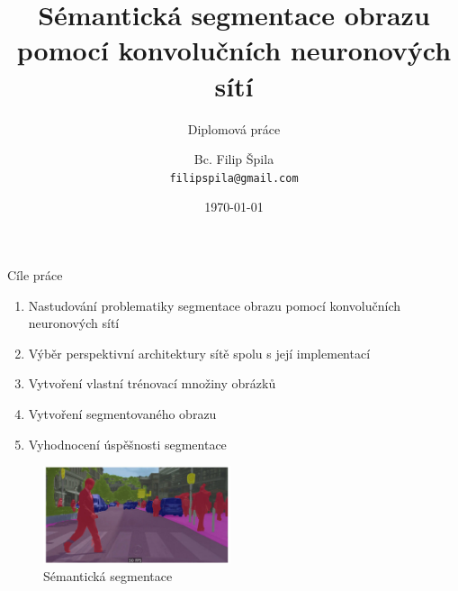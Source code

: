\documentclass[aspectratio=1610]{beamer}
\title[Sémantická segmentace obrazu pomocí CNN]
{Sémantická segmentace obrazu pomocí konvolučních neuronových sítí}
\subtitle
{Diplomová práce}
\author[Bc. Filip Špila]
{Bc. Filip Špila \\
	\texttt{filipspila@gmail.com}}
\institute
{Ústav mechaniky těles, mechatroniky a biomechaniky \\
	Vysoké učení technické v Brně
}
\date{\today}
\begin{document}
	
	
	\begin{frame}
	\titlepage
\end{frame}


\begin{frame}{Cíle práce}
\begin{enumerate}
	\item Nastudování problematiky segmentace obrazu pomocí konvolučních neuronových sítí
	\item Výběr perspektivní architektury sítě spolu s její implementací
	\item Vytvoření vlastní trénovací množiny obrázků
	\item Vytvoření segmentovaného obrazu
	\item Vyhodnocení úspěšnosti segmentace
\end{enumerate}	
	
\begin{center}
	\begin{figure}
		\includegraphics[width=5.5cm]{semseg.jpg}	
		\caption{Sémantická segmentace}		
	\end{figure}	
\end{center}
\end{frame}

\end{document}
